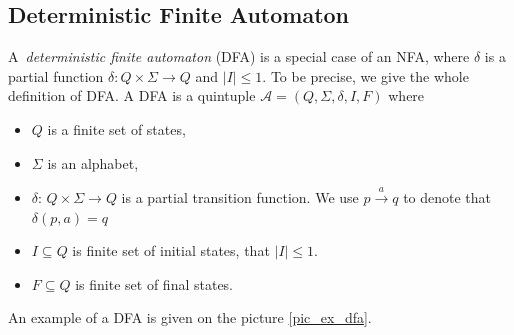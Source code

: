 	\subsection{Deterministic Finite Automaton}
	\label{defDFA}
  A~\emph{deterministic finite automaton} (DFA) is a special case of an NFA, where $\delta$ is a partial function 
$\delta: Q\times \Sigma \to Q$ and $|I| \leq 1$. To be precise, we give the whole definition of DFA.\newline
\newline
		A DFA is a quintuple $\mathcal{A}=(Q,\Sigma,\delta,I,F)$ where
		\begin{itemize}
			\item $Q$ is a finite set of states,
			\item $\Sigma$ is  an alphabet,
			\item $\delta$:  $Q \times \Sigma \to Q$ is a partial transition function. We use $p \xrightarrow{a} q$ to denote that $\delta(p,a)=q$
			\item $I\subseteq Q$ is finite set of initial states, that $|I| \leq 1$.
			\item $F\subseteq Q$ is finite set of final states.
		\end{itemize}
    An example of a DFA is given on the picture \ref{pic_ex_dfa}.


